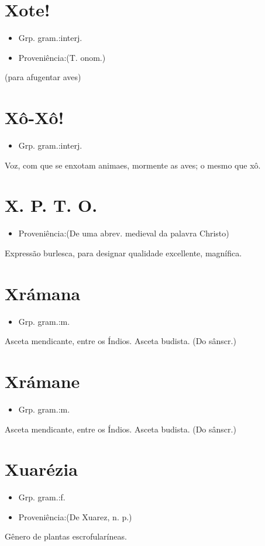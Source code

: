\section{Xote!}
\begin{itemize}
\item {Grp. gram.:interj.}
\end{itemize}
\begin{itemize}
\item {Proveniência:(T. onom.)}
\end{itemize}
(para afugentar aves)
\section{Xô-Xô!}
\begin{itemize}
\item {Grp. gram.:interj.}
\end{itemize}
Voz, com que se enxotam animaes, mormente as aves; o mesmo que \textunderscore xô\textunderscore .
\section{X. P. T. O.}
\begin{itemize}
\item {Proveniência:(De uma abrev. medieval da palavra \textunderscore Christo\textunderscore )}
\end{itemize}
Expressão burlesca, para designar qualidade excellente, magnífica.
\section{Xrámana}
\begin{itemize}
\item {Grp. gram.:m.}
\end{itemize}
Asceta mendicante, entre os Índios.
Asceta budista.
(Do sânscr.)
\section{Xrámane}
\begin{itemize}
\item {Grp. gram.:m.}
\end{itemize}
Asceta mendicante, entre os Índios.
Asceta budista.
(Do sânscr.)
\section{Xuarézia}
\begin{itemize}
\item {Grp. gram.:f.}
\end{itemize}
\begin{itemize}
\item {Proveniência:(De \textunderscore Xuarez\textunderscore , n. p.)}
\end{itemize}
Gênero de plantas escrofularíneas.
